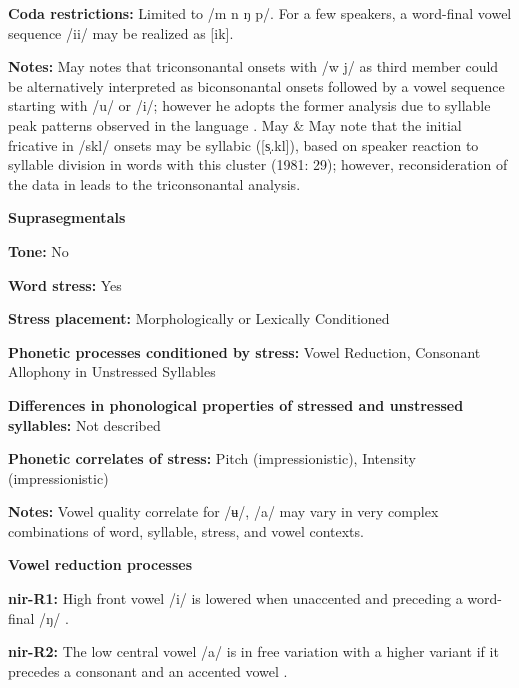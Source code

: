 \textbf{Coda restrictions:} Limited to /m n ŋ p/. For a few speakers, a word-final vowel sequence /ii/ may be realized as [ik].



\textbf{Notes:} May notes that triconsonantal onsets with /w j/ as third member could be alternatively interpreted as biconsonantal onsets followed by a vowel sequence starting with /u/ or /i/; however he adopts the former analysis due to syllable peak patterns observed in the language \citep[17-18]{May1997}. May \& May note that the initial fricative in /skl/ onsets may be syllabic ([s̩.kl]), based on speaker reaction to syllable division in words with this cluster (1981: 29); however, reconsideration of the data in \citealt{May1997} leads to the triconsonantal analysis.



\textbf{Suprasegmentals}



\textbf{Tone:} No



\textbf{Word stress:} Yes



\textbf{Stress placement:} Morphologically or Lexically Conditioned



\textbf{Phonetic processes conditioned by stress:} Vowel Reduction, Consonant Allophony in Unstressed Syllables



\textbf{Differences in phonological properties of stressed and unstressed syllables:} Not described



\textbf{Phonetic correlates of stress:} Pitch (impressionistic), Intensity (impressionistic)



\textbf{Notes:} Vowel quality correlate for /ʉ/, /a/ may vary in very complex combinations of word, syllable, stress, and vowel contexts.



\textbf{Vowel reduction processes}



\textbf{nir-R1:} High front vowel /i/ is lowered when unaccented and preceding a word-final /ŋ/ \citep[10]{Anceaux1965}.



\textbf{nir-R2:} The low central vowel /a/ is in free variation with a higher variant if it precedes a consonant and an accented vowel \citep[13]{Anceaux1965}.



